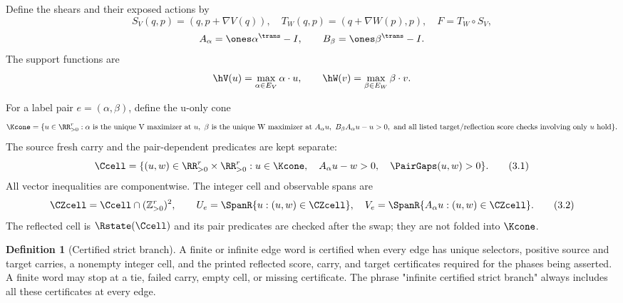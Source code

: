 \documentclass[11pt]{article}
\theoremstyle{definition}
\newtheorem{definition}[theorem]{Definition}
\theoremstyle{remark}
\begin{document}
Define the shears and their exposed actions by
\[
 S_V(q,p)=(q,p+\nabla V(q)),\quad
 T_W(q,p)=(q+\nabla W(p),p),\quad F=T_W\circ S_V,
\]
\[
 A_\alpha=\ones\alpha^{\trans}-I,\qquad
 B_\beta=\ones\beta^{\trans}-I.
\]
The support functions are
\[
 \hV(u)=\max_{\alpha\in E_V}\alpha\cdot u,\qquad
 \hW(v)=\max_{\beta\in E_W}\beta\cdot v.
\]

For a label pair $e=(\alpha,\beta)$, define the u-only cone
\[
 \Kcone=\{u\in\RR_{>0}^r:
 \alpha\text{ is the unique V maximizer at }u,\ 
 \beta\text{ is the unique W maximizer at }A_\alpha u,
 \ B_\beta A_\alpha u-u>0,
 \text{ and all listed target/reflection score checks involving only }u
 \text{ hold}\}.
\]
The source fresh carry and the pair-dependent predicates are kept separate:
\[
 \Ccell=\{(u,w)\in\RR_{>0}^r\times\RR_{>0}^r:
 u\in\Kcone,\quad A_\alpha u-w>0,\quad
 \PairGaps(u,w)>0\}.
\tag{3.1}
\]
All vector inequalities are componentwise.  The integer cell and observable
spans are
\[
 \CZcell=\Ccell\cap(\mathbb Z_{>0}^r)^2,\qquad
 U_e=\SpanR\{u:(u,w)\in\CZcell\},\quad
 V_e=\SpanR\{A_\alpha u:(u,w)\in\CZcell\}.
\tag{3.2}
\]
The reflected cell is $\Rstate(\Ccell)$ and its pair predicates are checked
after the swap; they are not folded into $\Kcone$.

\begin{definition}[Certified strict branch]
A finite or infinite edge word is certified when every edge has unique
selectors, positive source and target carries, a nonempty integer cell, and
the printed reflected score, carry, and target certificates required for
the phases being asserted.  A finite word may stop at a tie, failed carry,
empty cell, or missing certificate.  The phrase "infinite certified strict
branch" always includes all these certificates at every edge.
\end{definition}
\end{document}
